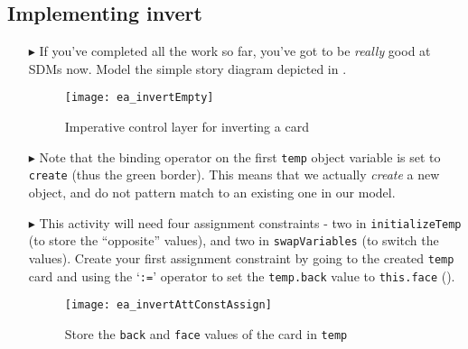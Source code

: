 \newpage
\hypertarget{invertCard vis}{}
\subsection{Implementing invert}
\genHeader

\begin{itemize}

\vspace{0.5cm}

\item[$\blacktriangleright$] If you've completed all the work so far, you've got to be \emph{really} good at SDMs now. Model the simple story diagram
depicted in .

\vspace{0.5cm}

\begin{figure}[htbp]
\begin{center}
  \texttt{[image: ea\_invertEmpty]}
  \caption{Imperative control layer for inverting a card}  
  \label{ea:sdm_invertEmpty}
\end{center}
\end{figure}

\item[$\blacktriangleright$] Note that the binding operator on the first \texttt{temp} object variable is set to \texttt{create} (thus the green
border). This means that we actually \emph{create} a new object, and do not pattern match to an existing one in our model.

\item[$\blacktriangleright$] This activity will need four assignment constraints - two in \texttt{in\-it\-ia\-lize\-Temp} (to store the ``opposite'' values),
and two in \texttt{swapVariables} (to switch the values). Create your first assignment constraint by going to the created \texttt{temp} card and using the
`\texttt{:=}' operator to set the \texttt{temp.back} value to \texttt{this.face} ().

\begin{figure}[htbp]
\begin{center}
  \texttt{[image: ea\_invertAttConstAssign]}
  \caption{Store the \texttt{back} and \texttt{face} values of the card in \texttt{temp}}  
  \label{ea:sdm_invertAssignment}
\end{center}
\end{figure}

\clearpage


\end{itemize}

